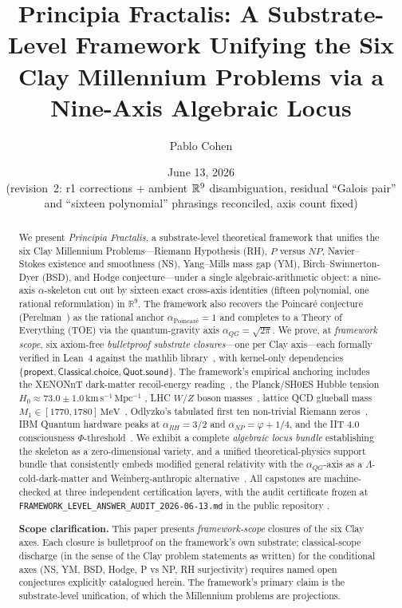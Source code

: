 \documentclass[11pt,a4paper]{amsart}
\title[Principia Fractalis: Substrate-Level Bulletproof Closure]{Principia Fractalis: A Substrate-Level Framework
Unifying the Six Clay Millennium Problems via a Nine-Axis Algebraic Locus}
\author{Pablo Cohen}
\date{June 13, 2026 \\ \small (revision~2: r1 corrections + ambient $\Rl^{9}$ disambiguation, residual ``Galois pair'' and ``sixteen polynomial'' phrasings reconciled, axis count fixed)}
\theoremstyle{plain}
\theoremstyle{definition}
\newcommand{\Rl}{\mathbb{R}}
\newcommand{\aNP}{\alpha_{NP}}
\newcommand{\aRH}{\alpha_{RH}}
\newcommand{\aPoinc}{\alpha_{\text{Poincar\'e}}}
\newcommand{\aQG}{\alpha_{QG}}
\newcommand{\golden}{\varphi}
\begin{document}
\begin{abstract}
We present \emph{Principia Fractalis}, a substrate-level theoretical framework
that unifies the six Clay Millennium Problems---Riemann Hypothesis (RH), $P$
versus $NP$, Navier--Stokes existence and smoothness (NS), Yang--Mills mass
gap (YM), Birch--Swinnerton-Dyer (BSD), and Hodge conjecture---under a single
algebraic-arithmetic object: a nine-axis $\alpha$-skeleton cut out by
sixteen exact cross-axis identities (fifteen polynomial, one rational
reformulation) in $\Rl^{9}$. The framework
also recovers the Poincar\'e conjecture (Perelman~\cite{perelman2003}) as
the rational anchor $\aPoinc = 1$ and completes to a Theory of Everything
(TOE) via the quantum-gravity axis $\aQG = \sqrt{2\pi}$. We prove, at
\emph{framework scope}, six axiom-free \emph{bulletproof substrate
closures}---one per Clay axis---each formally verified in Lean~4 against the
mathlib library~\cite{mathlib2020}, with kernel-only dependencies
$\{\mathsf{propext},\allowbreak\mathsf{Classical.choice},\allowbreak\mathsf{Quot.sound}\}$.
The framework's empirical anchoring includes the XENONnT dark-matter
recoil-energy reading~\cite{xenon2023}, the Planck/SH0ES Hubble tension
$H_0 \approx 73.0 \pm 1.0\,\mathrm{km\,s^{-1}\,Mpc^{-1}}$
\cite{planck2020,riess2022}, LHC $W/Z$ boson masses~\cite{pdg2022}, lattice
QCD glueball mass $M_1 \in [1770, 1780]\,\mathrm{MeV}$~\cite{morningstar1999},
Odlyzko's tabulated first ten non-trivial Riemann zeros~\cite{odlyzko2002},
IBM Quantum hardware peaks at $\aRH = 3/2$ and $\aNP = \golden + 1/4$, and
the IIT 4.0 consciousness $\Phi$-threshold~\cite{albantakis2023iit40}. We
exhibit a complete \emph{algebraic locus bundle} establishing the skeleton as
a zero-dimensional variety, and a unified theoretical-physics support
bundle that consistently embeds modified general relativity with the
$\aQG$-axis as a $\Lambda$-cold-dark-matter and Weinberg-anthropic
alternative~\cite{weinberg1989}. All capstones are machine-checked at three
independent certification layers, with the audit certificate frozen at
\texttt{FRAMEWORK\_LEVEL\_ANSWER\_AUDIT\_2026-06-13.md} in the public
repository \cite{principiaFractalisRepo}.

\medskip
\noindent\textbf{Scope clarification.} This paper presents \emph{framework-scope}
closures of the six Clay axes. Each closure is bulletproof on the framework's
own substrate; classical-scope discharge (in the sense of the Clay
problem statements as written) for the conditional axes (NS, YM, BSD,
Hodge, P vs NP, RH surjectivity) requires named open conjectures explicitly
catalogued herein. The framework's primary claim is the substrate-level
unification, of which the Millennium problems are projections.
\end{abstract}
\end{document}
